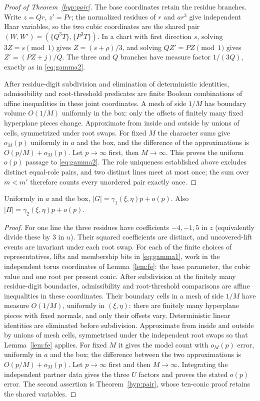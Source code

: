 \begin{proof}[Proof of Theorem~\ref{hyp:pair}]
The base coordinates retain the residue branches.  Write $z=Qr$, $z'=Pr$; the normalized residues of $r$ and $ar^3$
give independent Haar variables, so the two cubic coordinates are the shared pair
$(W,W')=(\{Q^3T\},\{P^3T\})$.  In a chart with first direction $s$, solving $3Z=s\pmod1$ gives
$Z=(s+\rho)/3$, and solving $QZ'=PZ\pmod1$ gives $Z'=(PZ+j)/Q$.
The three and $Q$ branches have measure factor $1/(3Q)$, exactly as in \eqref{eq:gamma2}.

After residue-digit subdivision and elimination of deterministic identities, admissibility and root-threshold predicates
are finite Boolean combinations of affine inequalities in these joint coordinates.  A mesh of side $1/M$ has boundary
volume $O(1/M)$ uniformly in the box: only the offsets of finitely many fixed hyperplane pieces change.
Approximate from inside and outside by unions of cells, symmetrized under root swaps.  For fixed $M$ the character sums
give $o_M(p)$ uniformly in $a$ and the box, and the difference of the approximations is $O(p/M)+o_M(p)$.
Let $p\to\infty$ first, then $M\to\infty$.  This proves the uniform $o(p)$ passage to \eqref{eq:gamma2}.
The role uniqueness established above excludes distinct equal-role pairs, and two distinct lines meet at most once;
the sum over $m<m'$ therefore counts every unordered pair exactly once.
\end{proof}

\begin{proposition}[counts]\label{prop:counts}
Uniformly in $a$ and the box, $|G|=\gamma_1(\xi,\eta)p+o(p)$.
Also $|\Pi|=\gamma_2(\xi,\eta)p+o(p)$.
\end{proposition}
\begin{proof}
For one line the three residues have coefficients $-4,-1,5$ in $z$ (equivalently divide these by $3$ in $u$).
Their squared coefficients are distinct, and uncovered-lift events are invariant under each root swap.
For each of the finite choices of representatives, lifts and membership bits in \eqref{eq:gamma1}, work in the independent torus coordinates
of Lemma~\ref{lem:fe}: the base parameter, the cubic value and one root per present conic.
After subdivision at the finitely many residue-digit boundaries, admissibility and root-threshold comparisons are affine inequalities in these coordinates.
Their boundary cells in a mesh of side $1/M$ have measure $O(1/M)$, uniformly in $(\xi,\eta)$: there are finitely many hyperplane pieces with fixed normals,
and only their offsets vary.  Deterministic linear identities are eliminated before subdivision.
Approximate from inside and outside by unions of mesh cells, symmetrised under the independent root swaps so that Lemma~\ref{lem:fe} applies.
For fixed $M$ it gives the model count with $o_M(p)$ error, uniformly in $a$ and the box; the difference between the two approximations is
$O(p/M)+o_M(p)$.  Let $p\to\infty$ first and then $M\to\infty$.  Integrating the independent partner data gives the three $U$ factors and proves the stated $o(p)$ error.
The second assertion is Theorem~\ref{hyp:pair}, whose ten-conic proof retains the shared variables.
\end{proof}

